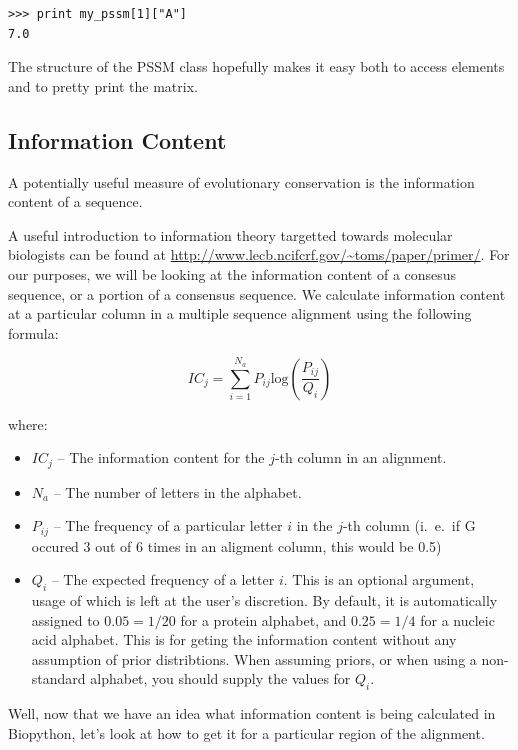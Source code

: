 \documentclass{report}
\begin{document}
\begin{verbatim}
>>> print my_pssm[1]["A"]
7.0
\end{verbatim}

The structure of the PSSM class hopefully makes it easy both to access elements and to pretty print the matrix.

\subsection{Information Content}
\label{sec:getting_info_content}

A potentially useful measure of evolutionary conservation is the information content of a sequence.

A useful introduction to information theory targetted towards molecular biologists can be found at \url{http://www.lecb.ncifcrf.gov/~toms/paper/primer/}. For our purposes, we will be looking at the information content of a consesus sequence, or a portion of a consensus sequence. We calculate information content at a particular column in a multiple sequence alignment using the following formula:

\begin{displaymath}
IC_{j} = \sum_{i=1}^{N_{a}} P_{ij} \mathrm{log}\left(\frac{P_{ij}}{Q_{i}}\right)
\end{displaymath}

\noindent where:

\begin{itemize}
  \item $IC_{j}$ -- The information content for the $j$-th column in an alignment.
  \item $N_{a}$ -- The number of letters in the alphabet.
  \item $P_{ij}$ -- The frequency of a particular letter $i$ in the $j$-th column (i.~e.~if G occured 3 out of 6 times in an aligment column, this would be 0.5)
  \item $Q_{i}$ --  The expected frequency of a letter $i$. This is an
  optional argument, usage of which is left at the user's
  discretion. By default, it is automatically assigned to $0.05 = 1/20$ for a
  protein alphabet, and $0.25 = 1/4$ for a nucleic acid alphabet. This is for
  geting the information content without any assumption of prior
  distribtions. When assuming priors, or when using a non-standard
  alphabet, you should supply the values for $Q_{i}$.
\end{itemize}

Well, now that we have an idea what information content is being calculated in Biopython, let's look at how to get it for a particular region of the alignment.
\end{document}
